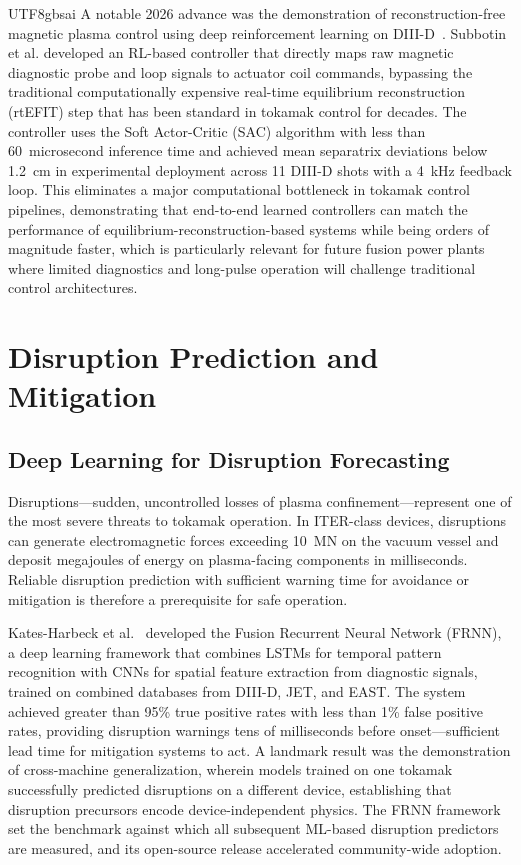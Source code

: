 \documentclass[12pt,a4paper]{article}
\begin{document}
\begin{CJK}{UTF8}{gbsai}
A notable 2026 advance was the demonstration of reconstruction-free magnetic plasma control using deep reinforcement learning on DIII-D~\citep{Subbotin2026}. Subbotin et al. developed an RL-based controller that directly maps raw magnetic diagnostic probe and loop signals to actuator coil commands, bypassing the traditional computationally expensive real-time equilibrium reconstruction (rtEFIT) step that has been standard in tokamak control for decades. The controller uses the Soft Actor-Critic (SAC) algorithm with less than 60~microsecond inference time and achieved mean separatrix deviations below 1.2~cm in experimental deployment across 11 DIII-D shots with a 4~kHz feedback loop. This eliminates a major computational bottleneck in tokamak control pipelines, demonstrating that end-to-end learned controllers can match the performance of equilibrium-reconstruction-based systems while being orders of magnitude faster, which is particularly relevant for future fusion power plants where limited diagnostics and long-pulse operation will challenge traditional control architectures.

\section{Disruption Prediction and Mitigation}

\subsection{Deep Learning for Disruption Forecasting}

Disruptions---sudden, uncontrolled losses of plasma confinement---represent one of the most severe threats to tokamak operation. In ITER-class devices, disruptions can generate electromagnetic forces exceeding 10~MN on the vacuum vessel and deposit megajoules of energy on plasma-facing components in milliseconds. Reliable disruption prediction with sufficient warning time for avoidance or mitigation is therefore a prerequisite for safe operation.

Kates-Harbeck et al.~\citep{KatesHarbeck2019} developed the Fusion Recurrent Neural Network (FRNN), a deep learning framework that combines LSTMs for temporal pattern recognition with CNNs for spatial feature extraction from diagnostic signals, trained on combined databases from DIII-D, JET, and EAST. The system achieved greater than 95\% true positive rates with less than 1\% false positive rates, providing disruption warnings tens of milliseconds before onset---sufficient lead time for mitigation systems to act. A landmark result was the demonstration of cross-machine generalization, wherein models trained on one tokamak successfully predicted disruptions on a different device, establishing that disruption precursors encode device-independent physics. The FRNN framework set the benchmark against which all subsequent ML-based disruption predictors are measured, and its open-source release accelerated community-wide adoption.


\end{CJK}
\end{document}
